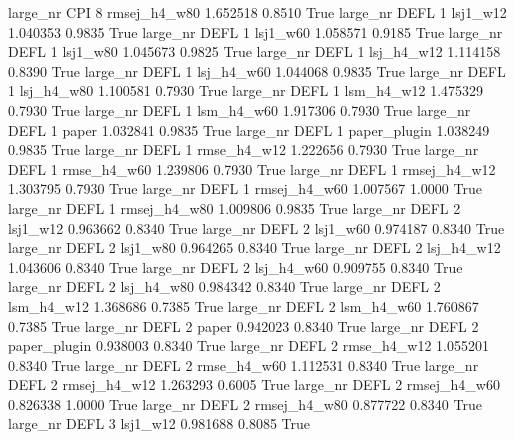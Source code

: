   large_nr      CPI                 8 rmsej_h4_w80    1.652518      0.8510    True
  large_nr     DEFL                 1     lsj1_w12    1.040353      0.9835    True
  large_nr     DEFL                 1     lsj1_w60    1.058571      0.9185    True
  large_nr     DEFL                 1     lsj1_w80    1.045673      0.9825    True
  large_nr     DEFL                 1   lsj_h4_w12    1.114158      0.8390    True
  large_nr     DEFL                 1   lsj_h4_w60    1.044068      0.9835    True
  large_nr     DEFL                 1   lsj_h4_w80    1.100581      0.7930    True
  large_nr     DEFL                 1   lsm_h4_w12    1.475329      0.7930    True
  large_nr     DEFL                 1   lsm_h4_w60    1.917306      0.7930    True
  large_nr     DEFL                 1        paper    1.032841      0.9835    True
  large_nr     DEFL                 1 paper_plugin    1.038249      0.9835    True
  large_nr     DEFL                 1  rmse_h4_w12    1.222656      0.7930    True
  large_nr     DEFL                 1  rmse_h4_w60    1.239806      0.7930    True
  large_nr     DEFL                 1 rmsej_h4_w12    1.303795      0.7930    True
  large_nr     DEFL                 1 rmsej_h4_w60    1.007567      1.0000    True
  large_nr     DEFL                 1 rmsej_h4_w80    1.009806      0.9835    True
  large_nr     DEFL                 2     lsj1_w12    0.963662      0.8340    True
  large_nr     DEFL                 2     lsj1_w60    0.974187      0.8340    True
  large_nr     DEFL                 2     lsj1_w80    0.964265      0.8340    True
  large_nr     DEFL                 2   lsj_h4_w12    1.043606      0.8340    True
  large_nr     DEFL                 2   lsj_h4_w60    0.909755      0.8340    True
  large_nr     DEFL                 2   lsj_h4_w80    0.984342      0.8340    True
  large_nr     DEFL                 2   lsm_h4_w12    1.368686      0.7385    True
  large_nr     DEFL                 2   lsm_h4_w60    1.760867      0.7385    True
  large_nr     DEFL                 2        paper    0.942023      0.8340    True
  large_nr     DEFL                 2 paper_plugin    0.938003      0.8340    True
  large_nr     DEFL                 2  rmse_h4_w12    1.055201      0.8340    True
  large_nr     DEFL                 2  rmse_h4_w60    1.112531      0.8340    True
  large_nr     DEFL                 2 rmsej_h4_w12    1.263293      0.6005    True
  large_nr     DEFL                 2 rmsej_h4_w60    0.826338      1.0000    True
  large_nr     DEFL                 2 rmsej_h4_w80    0.877722      0.8340    True
  large_nr     DEFL                 3     lsj1_w12    0.981688      0.8085    True
